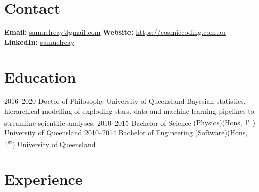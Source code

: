 \documentclass[11pt]{friggeri-cv}
\begin{document}
\pagestyle{plain}


\section{Contact}

\textbf{Email: } \href{samuelreay@gmail.com}{samuelreay@gmail.com}   \hspace{1mm}
\textbf{Website: } \href{https://cosmiccoding.com.au}{https://cosmiccoding.com.au}   
\textbf{LinkedIn: } \href{https://www.linkedin.com/in/samuelreay/}{samuelreay}



\section{Education}

\begin{entrylist}
\entry
{2016--2020}
{Doctor of Philosophy}
{University of Queensland}
{Bayesian statistics, hierarchical modelling of exploding stars, data and machine learning pipelines to streamline scientific analyses.}
\entrysmall
{2010--2015}
{Bachelor of Science {\normalfont (Physics)(Hons, 1\textsuperscript{st})}}
{University of Queensland}
{}%
\entrysmall
{2010--2014}
{Bachelor of Engineering {\normalfont (Software)(Hons, 1\textsuperscript{st})}}
{University of Queensland}
{}%
\end{entrylist}



\section{Experience}
\end{document}
